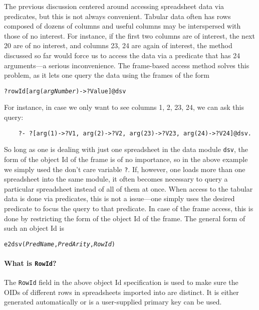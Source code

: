 The previous discussion centered around accessing spreadsheet data via
predicates, but this is not always convenient. Tabular data often has
rows composed of dozens of columns and useful columns may be interspersed
with those of no interest. For instance, if the first two columns are of
interest, the next 20 are of no interest, and columns 23, 24 are again of
interest, the method discussed so far
would force us to access the data via a predicate that has 24 arguments---a
serious inconvenience. The frame-based access method solves this problem,
as it lets one query the data using the frames of the form
\begin{alltt}
    ?rowId[arg(\textnormal{\emph{argNumber}}) -> ?Value]@dsv
\end{alltt}
For instance, in case we only want to see columns 1, 2, 23, 24, we can ask
this query:
\begin{verbatim}
    ?- ?[arg(1)->?V1, arg(2)->?V2, arg(23)->?V23, arg(24)->?V24]@dsv.
\end{verbatim}
So long as one is dealing with just one spreadsheet in the data module
\texttt{\bs{}dsv}, the form of the object Id of the frame is of no
importance, so in the above example we simply used the don't care variable
\texttt{?}. If, however, one loads more than one spreadsheet into the same
module, it often becomes necessary to query a particular spreadsheet
instead of all of them at once.
When access to the tabular data is done via predicates, this is not a
issue---one simply uses the desired predicate to focus the query to that
predicate. In case of the frame access, this is done by restricting the
form of the object Id of the frame. The general form of such an object Id is
\begin{alltt}
    \bs{}e2dsv(\textnormal{\emph{PredName}},\textnormal{\emph{PredArity}},\textnormal{\emph{RowId}})
\end{alltt}
\paragraph{What is \texttt{RowId}?}
The \texttt{RowId} field in the above object Id specification is used
to make sure the OIDs of different rows in spreadsheets
imported into \ERGO are distinct. It is either generated automatically or
is a user-supplied primary key can be used.

